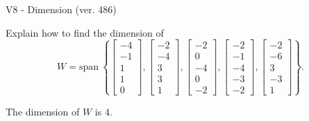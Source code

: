 \begin{exercise}
  \begin{exerciseTitle}V8 - Dimension (ver. 486)\end{exerciseTitle}
  \begin{exerciseStatement}
    Explain how to find the dimension of 
\[W=\mathrm{span}\ \left\{\left[\begin{array}{r}
-4 \\
-1 \\
1 \\
1 \\
0
\end{array}\right] , \left[\begin{array}{r}
-2 \\
-4 \\
3 \\
3 \\
1
\end{array}\right] , \left[\begin{array}{r}
-2 \\
0 \\
-4 \\
0 \\
-2
\end{array}\right] , \left[\begin{array}{r}
-2 \\
-1 \\
-4 \\
-3 \\
-2
\end{array}\right] , \left[\begin{array}{r}
-2 \\
-6 \\
3 \\
-3 \\
1
\end{array}\right]\right\}.\]



  \end{exerciseStatement}
  \begin{exerciseAnswer}
   The dimension of \(W\) is  \(4\).
  


  \end{exerciseAnswer}
\end{exercise}
